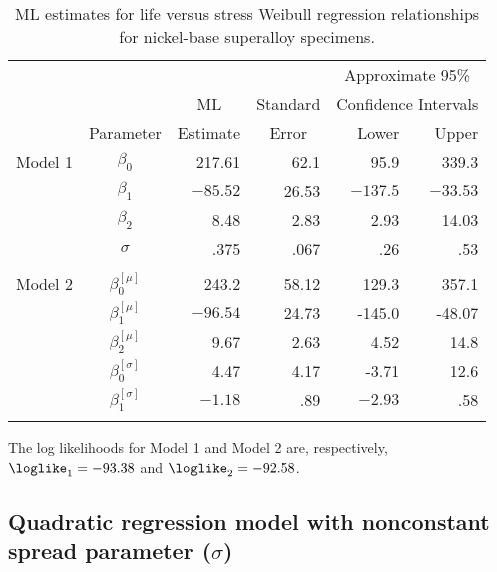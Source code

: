 \begin{table}
\caption{ML estimates for life versus
stress Weibull regression relationships for nickel-base superalloy
specimens.}
\centering\small
\begin{tabular}{lcrrrr} 
\\[-.5ex]
\hline
 & & & & \multicolumn{2}{c}{Approximate 95\%} \\
 & &\multicolumn{1}{c}{ML} &Standard  & \multicolumn{2}{c}{Confidence Intervals}\\  \cline{5-6}
& Parameter & Estimate& \multicolumn{1}{c}{Error} & Lower & Upper \\
\hline 
Model 1 &
 $\beta_{0}$ &217.61 &62.1 &95.9 & 339.3\\[.7ex] 
 &$\beta_{1}$ &$-85.52$ &26.53 &$-137.5$ &$-33.53$ \\[.7ex] 
 &$\beta_{2}$ &8.48 &2.83 &2.93 & 14.03\\[.7ex] 
 &$\sigma$ &.375 &.067 &.26  &.53 \\[1.2ex]
\hline 
\\[-1.8ex]
Model 2 &
$\beta_{0}^{[\mu]}$ &243.2 &58.12 &129.3 &357.1 \\[.7ex] 
 &$\beta_{1}^{[\mu]}$ &$ -96.54$ &24.73 &-145.0 &-48.07 \\[.7ex] 
 &$\beta_{2}^{[\mu]}$ &  9.67 &2.63 &4.52 &14.8 \\[.7ex] 
 &$\beta_{0}^{[\sigma]}$ &4.47 &4.17 &-3.71 & 12.6 \\[.7ex]
 &$\beta_{1}^{[\sigma]}$ &$-1.18$ &.89 &$-2.93$ &.58 \\[.7ex]
\hline
\\[-1.8ex]
\end{tabular}
\begin{minipage}[t]{4in}
The log likelihoods for Model 1 and Model 2 are, respectively,
$\loglike_{1}=-93.38$ and $\loglike_{2}=-92.58$.
\end{minipage}
\label{table:super.alloy.mles}
\end{table}

\subsection{Quadratic regression model with nonconstant spread
parameter ($\sigma$)}

